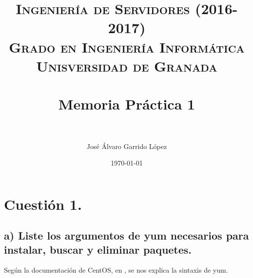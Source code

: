 


\title{	
\normalfont \normalsize 
\textsc{\textbf{Ingeniería de Servidores (2016-2017)} \\ Grado en Ingeniería Informática \\ Unisversidad de Granada} \\ [25pt] %
\horrule{0.5pt} \\[0.4cm] %
\huge Memoria Práctica 1 \\ %
\horrule{2pt} \\[0.5cm] %
}

\author{José Álvaro Garrido López} %

\date{\normalsize\today} %




\maketitle %

\newpage %

\tableofcontents %

\listoffigures

\newpage

\newpage

\section{Cuestión 1.}

\subsection{a) Liste los argumentos de yum necesarios para instalar, buscar y eliminar paquetes.}

Según la documentación de CentOS, en \cite{yum}, se nos explica la sintaxis de yum.

